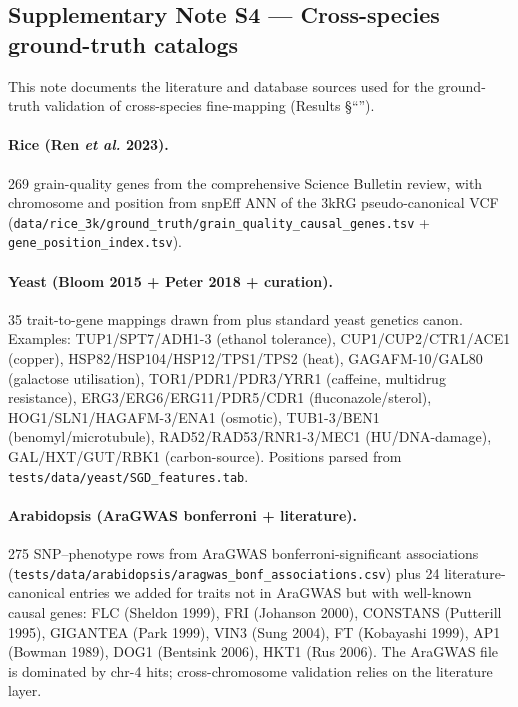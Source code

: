 \clearpage

\subsection*{Supplementary Note S4 --- Cross-species ground-truth catalogs}\label{snote:multispecies_gt}

This note documents the literature and database sources used for the
ground-truth validation of cross-species fine-mapping (Results
\S``'').

\paragraph{Rice (Ren \emph{et al.} 2023).}
269 grain-quality genes from the comprehensive Science Bulletin
review\cite{ren2023rice}, with chromosome and position from snpEff
ANN of the 3kRG pseudo-canonical VCF
(\texttt{data/rice\_3k/ground\_truth/grain\_quality\_causal\_genes.tsv}
+ \texttt{gene\_position\_index.tsv}).

\paragraph{Yeast (Bloom 2015 + Peter 2018 + curation).}
35 trait-to-gene mappings drawn from\cite{peter2018genome,bloom2015genetic}
plus standard yeast genetics canon. Examples:
TUP1/SPT7/ADH1-3 (ethanol tolerance), CUP1/CUP2/CTR1/ACE1 (copper),
HSP82/HSP104/HSP12/TPS1/TPS2 (heat), GAGAFM-10/GAL80
(galactose utilisation), TOR1/PDR1/PDR3/YRR1 (caffeine, multidrug
resistance), ERG3/ERG6/ERG11/PDR5/CDR1 (fluconazole/sterol),
HOG1/SLN1/HAGAFM-3/ENA1 (osmotic), TUB1-3/BEN1 (benomyl/microtubule),
RAD52/RAD53/RNR1-3/MEC1 (HU/DNA-damage), GAL/HXT/GUT/RBK1
(carbon-source). Positions parsed from
\texttt{tests/data/yeast/SGD\_features.tab}.

\paragraph{Arabidopsis (AraGWAS bonferroni + literature).}
275 SNP--phenotype rows from AraGWAS bonferroni-significant
associations (\texttt{tests/data/arabidopsis/aragwas\_bonf\_associations.csv})
plus 24 literature-canonical entries we added for traits not in
AraGWAS but with well-known causal genes:
FLC (Sheldon 1999), FRI (Johanson 2000), CONSTANS (Putterill 1995),
GIGANTEA (Park 1999), VIN3 (Sung 2004), FT (Kobayashi 1999), AP1
(Bowman 1989), DOG1 (Bentsink 2006), HKT1 (Rus 2006). The AraGWAS file is dominated by chr-4 hits; cross-chromosome
validation relies on the literature layer.

